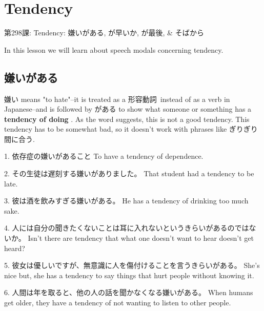     
\chapter{Tendency}

\begin{center}
\begin{Large}
第298課: Tendency: 嫌いがある, が早いか, が最後, \& そばから 
\end{Large}
\end{center}
 
\par{ In this lesson we will learn about speech modals concerning tendency. }
      
\section{嫌いがある}
 
\par{ 嫌い means "to hate"--it is treated as a 形容動詞 instead of as a verb in Japanese--and is followed by がある to show what someone or something has a \textbf{tendency of doing }. As the word suggests, this is not a good tendency. This tendency has to be somewhat bad, so it doesn't work with phrases like ぎりぎり間に合う. }

\par{1. 依存症の嫌いがあること \hfill\break
To have a tendency of dependence. }

\par{2. その生徒は遅刻する嫌いがありました。 \hfill\break
That student had a tendency to be late. }

\par{3. 彼は酒を飲みすぎる嫌いがある。 \hfill\break
He has a tendency of drinking too much sake. }

\par{4. 人には自分の聞きたくないことは耳に入れないというきらいがあるのではないか。 \hfill\break
Isn't there are tendency that what one doesn't want to hear doesn't get heard? }

\par{5. 彼女は優しいですが、無意識に人を傷付けることを言うきらいがある。 \hfill\break
She's nice but, she has a tendency to say things that hurt people without knowing it. }

\par{6. 人間は年を取ると、他の人の話を聞かなくなる嫌いがある。 \hfill\break
When humans get older, they have a tendency of not wanting to listen to other people.  }
      
